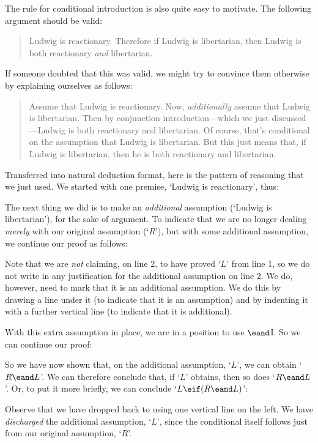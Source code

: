 The rule for conditional introduction is also quite easy to motivate. The following argument should be valid:
	\begin{quote}
		Ludwig is reactionary. Therefore if Ludwig is libertarian, then Ludwig is both reactionary \emph{and} libertarian.
	\end{quote}
If someone doubted that this was valid, we might try to convince them otherwise by explaining ourselves as follows:
	\begin{quote}
		Assume that Ludwig is reactionary. Now, \emph{additionally} assume that Ludwig is libertarian. Then by conjunction introduction---which we just discussed---Ludwig is both reactionary and libertarian. Of course, that's conditional on the assumption that Ludwig is libertarian. But this just means that, if Ludwig is libertarian, then he is both reactionary and libertarian.
	\end{quote}
Transferred into natural deduction format, here is the pattern of reasoning that we just used. We started with one premise, `Ludwig is reactionary', thus:
	\begin{fitchproof}
	\end{fitchproof}
The next thing we did is to make an \emph{additional} assumption (`Ludwig is libertarian'), for the sake of argument. To indicate that we are no longer dealing \emph{merely} with our original assumption (`$R$'), but with some additional assumption, we continue our proof as follows:
	\begin{fitchproof}
		\hypo{r}{R}
		\open
			\hypo{l}{L}
	\end{fitchproof}
Note that we are \emph{not} claiming, on line 2, to have proved `$L$' from line 1, so we do not write in any justification for the additional assumption on line 2. We do, however, need to mark that it is an additional assumption. We do this by drawing a line under it (to indicate that it is an assumption) and by indenting it with a further vertical line (to indicate that it is additional).

With this extra assumption in place, we are in a position to use $\eand$I. So we can continue our proof:
	\begin{fitchproof}
		\open
			\ai{r, l}
	\end{fitchproof}
So we have now shown that, on the additional assumption, `$L$', we can obtain `$R \eand L$'. We can therefore conclude that, if `$L$' obtains, then so does `$R \eand L$'. Or, to put it more briefly, we can conclude `$L \eif (R \eand L)$':
	\begin{fitchproof}
		\hypo{r}{R}
		\open
			\hypo{l}{L}
			\ai{r, l}
			\close
		\ci{l-rl}
	\end{fitchproof}
Observe that we have dropped back to using one vertical line on the left.  We have \emph{discharged} the additional assumption, `$L$', since the conditional itself follows just from our original assumption, `$R$'.


